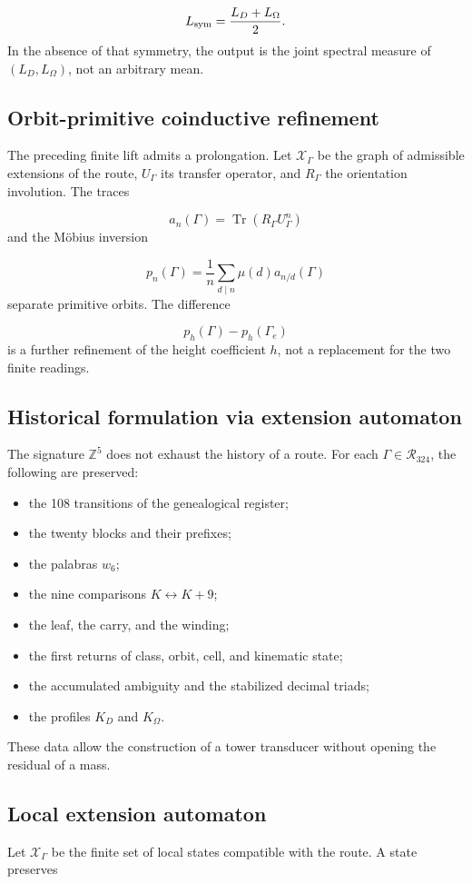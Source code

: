 \[
 L_{\rm sym}=\frac{L_D+L_\Omega}{2}.
\]
In the absence of that symmetry, the output is the joint spectral measure of \((L_D,L_\Omega)\), not an arbitrary mean.

\subsection{Orbit-primitive coinductive refinement}
The preceding finite lift admits a prolongation. Let \(\mathscr X_\Gamma\) be the graph of admissible extensions of the route, \(U_\Gamma\) its transfer operator, and \(R_\Gamma\) the orientation involution. The traces

\[
 a_n(\Gamma)=\operatorname{Tr}(R_\Gamma U_\Gamma^n)
\]
and the Möbius inversion

\[
 p_n(\Gamma)=\frac1n\sum_{d\mid n}\mu(d)a_{n/d}(\Gamma)
\]
separate primitive orbits. The difference

\[
 p_h(\Gamma)-p_h(\Gamma_e)
\]
is a further refinement of the height coefficient \(h\), not a replacement for the two finite readings.

\subsection{Historical formulation via extension automaton}
The signature \(\mathbb Z^5\) does not exhaust the history of a route. For each \(\Gamma\in\mathcal R_{324}\), the following are preserved:

\begin{itemize}
\item the 108 transitions of the genealogical register;
\item the twenty blocks and their prefixes;
\item the palabras \(w_6\);
\item the nine comparisons \(K\leftrightarrow K+9\);
\item the leaf, the carry, and the winding;
\item the first returns of class, orbit, cell, and kinematic state;
\item the accumulated ambiguity and the stabilized decimal triads;
\item the profiles \(K_D\) and \(K_\Omega\).
\end{itemize}
These data allow the construction of a tower transducer without opening the residual of a mass.

\subsection{Local extension automaton}
Let \(\mathscr X_\Gamma\) be the finite set of local states compatible with the route. A state preserves

